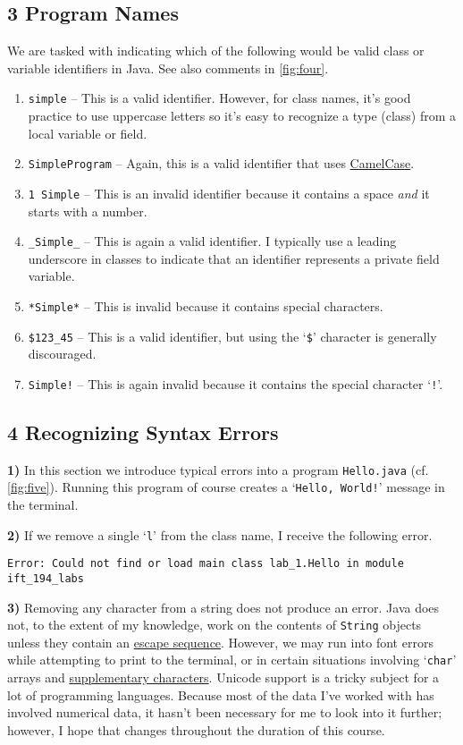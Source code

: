 \documentclass[leqno, 11pt]{article}
\begin{document}
\subsection*{3 Program Names}
We are tasked with indicating which of the following would be valid class or variable identifiers in Java. See also comments in \autoref{fig:four}.
\begin{enumerate}
  \item \texttt{simple} -- This is a valid identifier. However, for class names, it's good practice to use uppercase letters so it's easy to recognize a type (class) from a local variable or field.
  \item \texttt{SimpleProgram} -- Again, this is a valid identifier that uses \href{https://en.wikipedia.org/wiki/Camel_case}{CamelCase}.
  \item \texttt{1 Simple} -- This is an invalid identifier because it contains a space \textit{and} it starts with a number.
  \item \texttt{\_Simple\_} -- This is again a valid identifier. I typically use a leading underscore in classes to indicate that an identifier represents a private field variable.
  \item \texttt{*Simple*} -- This is invalid because it contains special characters.
  \item \texttt{\$123\_45} -- This is a valid identifier, but using the `\texttt{\$}' character is generally discouraged.
  \item \texttt{Simple!} -- This is again invalid because it contains the special character `\texttt{!}'.
\end{enumerate}
\subsection*{4 Recognizing Syntax Errors}
\textbf{1)} In this section we introduce typical errors into a program \texttt{Hello.java} (cf. \autoref{fig:five}). Running this program of course creates a `\texttt{Hello, World!}' message in the terminal.

\textbf{2)} If we remove a single `\texttt{l}' from the class name, I receive the following error.
\begin{verbatim}
Error: Could not find or load main class lab_1.Hello in module ift_194_labs
\end{verbatim}

\textbf{3)} Removing any character from a string does not produce an error. Java does not, to the extent of my knowledge, work on the contents of \texttt{String} objects unless they contain an \href{https://docs.oracle.com/javase/tutorial/java/data/characters.html?PHPSESSID=c49feb01c8dab87a4350a9ec321a08f2}{escape sequence}. However, we may run into font errors while attempting to print to the terminal, or in certain situations involving `\texttt{char}' arrays and \href{http://www.oracle.com/us/technologies/java/supplementary-142654.html}{supplementary characters}. Unicode support is a tricky subject for a lot of programming languages. Because most of the data I've worked with has involved numerical data, it hasn't been necessary for me to look into it further; however, I hope that changes throughout the duration of this course.
\end{document}
